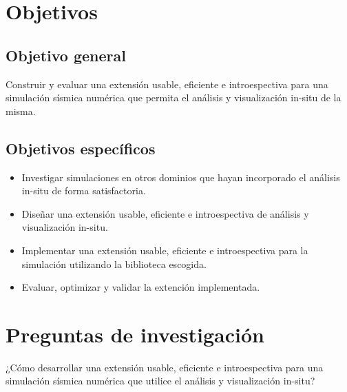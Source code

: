 \documentclass{article}
\begin{document}
\section{Objetivos}
\subsection{Objetivo general}
Construir y evaluar una extensión usable, eficiente e introespectiva para una simulación sísmica numérica que permita el análisis y visualización in-situ de la misma.
\subsection{Objetivos específicos}
\begin{itemize}
  \item Investigar simulaciones en otros dominios que hayan incorporado el análisis in-situ de forma satisfactoria.
  \item Diseñar una extensión usable, eficiente e introespectiva de análisis y visualización in-situ.
  \item Implementar una extensión usable, eficiente e introespectiva para la simulación utilizando la biblioteca escogida.
  \item Evaluar, optimizar y validar la extención implementada.
\end{itemize}

\section{Preguntas de investigación}
¿Cómo desarrollar una extensión usable, eficiente e introespectiva para una simulación sísmica numérica que utilice el análisis y visualización in-situ?

\printbibliography
\end{document}
